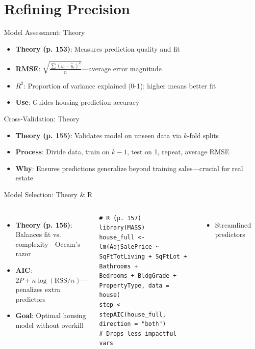\documentclass{beamer}
\begin{document}
	\section{Refining Precision}
	
	\begin{frame}{Model Assessment: Theory}
		\begin{itemize}
			\item \textbf{Theory (p. 153)}: Measures prediction quality and fit
			\item \textbf{RMSE}: $\sqrt{\frac{\sum (y_i - \hat{y}_i)^2}{n}}$—average error magnitude
			\item \textbf{$R^2$}: Proportion of variance explained (0-1); higher means better fit
			\item \textbf{Use}: Guides housing prediction accuracy
		\end{itemize}
	\end{frame}
	
	\begin{frame}{Cross-Validation: Theory}
		\begin{itemize}
			\item \textbf{Theory (p. 155)}: Validates model on unseen data via $k$-fold splits
			\item \textbf{Process}: Divide data, train on $k-1$, test on 1, repeat, average RMSE
			\item \textbf{Why}: Ensures predictions generalize beyond training sales—crucial for real estate
		\end{itemize}
	\end{frame}
	
	\begin{frame}[fragile]{Model Selection: Theory \& R}
		\begin{columns}
			\begin{itemize}
				\item \textbf{Theory (p. 156)}: Balances fit vs. complexity—Occam’s razor
				\item \textbf{AIC}: $2P + n\log(\text{RSS}/n)$—penalizes extra predictors
				\item \textbf{Goal}: Optimal housing model without overkill
			\end{itemize}
			\begin{lstlisting}
# R (p. 157)
library(MASS)
house_full <- lm(AdjSalePrice ~ SqFtTotLiving + SqFtLot + Bathrooms +
Bedrooms + BldgGrade + PropertyType, data = house)
step <- stepAIC(house_full, direction = "both")
# Drops less impactful vars
			\end{lstlisting}
			\begin{itemize}
				\item Streamlined predictors
			\end{itemize}
		\end{columns}
	\end{frame}
	
\end{document}
